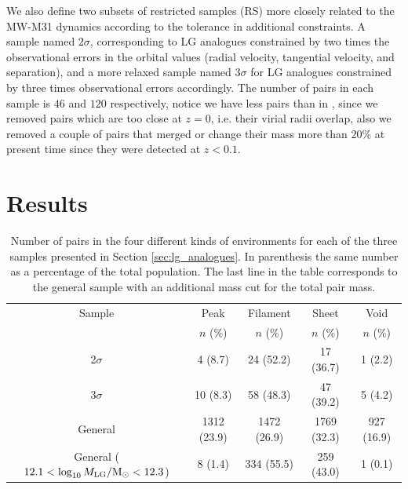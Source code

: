 \documentclass{emulateapj}
\newcommand{\Msun}{{\ifmmode{{\rm {M_{\odot}}}}\else{${\rm{M_{\odot}}}$}\fi}}
\begin{document}
We also define two subsets of restricted samples (RS) more closely
related to the MW-M31  dynamics according to the tolerance in
additional constraints. 
A sample named $2\sigma$, corresponding to LG analogues constrained by
two times the observational errors in the orbital values (radial
velocity, tangential velocity, and separation), and a more relaxed
sample named $3\sigma$ for LG analogues constrained by three times
observational errors accordingly.  
The number of pairs in each sample is $46$ and $120$ respectively,
notice we have less pairs than in \citet{lganalogues}, since
we removed pairs which are too close at $z=0$, i.e. their virial radii
overlap, also we removed a couple of pairs that merged or change their
mass more than $20\%$ at present time since they were detected at
$z<0.1$. 

\section{Results}
\label{sec:results}

\begin{table}
\begin{center}
\begin{tabular}{ccccc}\hline\hline
Sample & Peak & Filament & Sheet & Void\\
       & $n$ (\%) & $n$ (\%) & $n$ (\%) & $n$ (\%) \\\hline
2$\sigma$ & 4 (8.7) & 24 (52.2) &  17 (36.7) & 1 (2.2)\\
3$\sigma$ & 10 (8.3) & 58 (48.3) & 47 (39.2) & 5 (4.2)\\  
General & 1312 (23.9) & 1472 (26.9) & 1769 (32.3) & 927 (16.9)\\
General ($12.1<\log_{10} M_{\rm LG}/\Msun<12.3$)& 8 (1.4) & 334 (55.5) & 259
(43.0) & 1 (0.1)\\
\hline\hline
\end{tabular}
\caption{
Number of pairs in the four different kinds of environments for each
of the three samples presented in Section \ref{sec:lg_analogues}. 
In parenthesis the same number as a percentage of the total population.
The last line in the table corresponds to the general sample with an
additional mass cut for the total pair mass.  
\label{table:web_type}}
\end{center}
\end{table}
\end{document}
